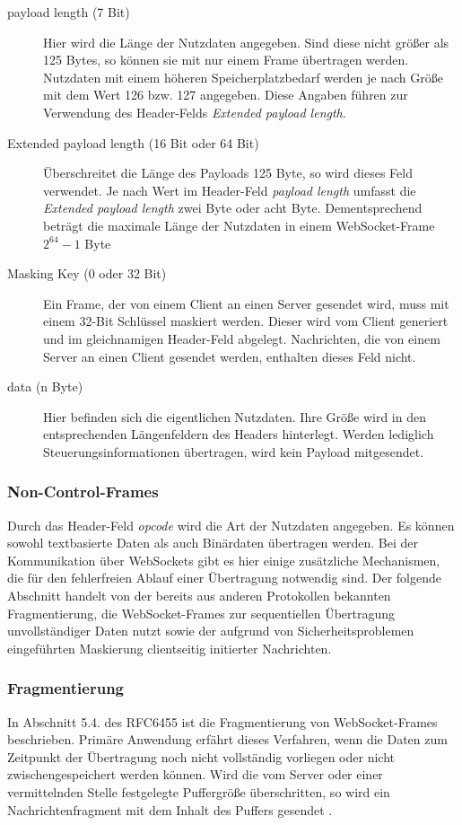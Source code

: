 \documentclass[11pt,a4paper,titlepage]{scrartcl}
\numberwithin{equation}{section}
\begin{document}
\begin{description}
	\item[payload length (7 Bit)] Hier wird die Länge der Nutzdaten angegeben. Sind diese nicht größer als 125 Bytes, so können sie mit nur einem Frame übertragen werden. Nutzdaten mit einem höheren Speicherplatzbedarf werden je nach Größe mit dem Wert 126 bzw. 127 angegeben. Diese Angaben führen zur Verwendung des Header-Felds \textit{Extended payload length}.
	\item[Extended payload length (16 Bit oder 64 Bit)] Überschreitet die Länge des Payloads 125 Byte, so wird dieses Feld verwendet. Je nach Wert im Header-Feld \textit{payload length} umfasst die \textit{Extended payload length} zwei Byte oder acht Byte. Dementsprechend beträgt die maximale Länge der Nutzdaten in einem WebSocket-Frame $2^{64} - 1$ Byte \autocite[41]{gorski_websockets_2015}
	\item[Masking Key (0 oder 32 Bit)] Ein Frame, der von einem Client an einen Server gesendet wird, muss mit einem 32-Bit Schlüssel maskiert werden. Dieser wird vom Client generiert und im gleichnamigen Header-Feld abgelegt. Nachrichten, die von einem Server an einen Client gesendet werden, enthalten dieses Feld nicht.
	\item[data (n Byte)] Hier befinden sich die eigentlichen Nutzdaten. Ihre Größe wird in den entsprechenden Längenfeldern des Headers hinterlegt. Werden lediglich Steuerungsinformationen übertragen, wird kein Payload mitgesendet.
\end{description}

\subsubsection{Non-Control-Frames}\label{subsubsec:wsNCFrames} 
Durch das Header-Feld \textit{opcode} wird die Art der Nutzdaten angegeben. Es können sowohl textbasierte Daten als auch Binärdaten übertragen werden. Bei der Kommunikation über WebSockets gibt es hier einige zusätzliche Mechanismen, die für den fehlerfreien Ablauf einer Übertragung notwendig sind. Der folgende Abschnitt handelt von der bereits aus anderen Protokollen bekannten Fragmentierung, die WebSocket-Frames zur sequentiellen Übertragung unvollständiger Daten nutzt sowie der aufgrund von Sicherheitsproblemen eingeführten Maskierung clientseitig initierter Nachrichten.

\subsubsection*{Fragmentierung}\label{subsubsec:wsFragment}
In Abschnitt 5.4. des RFC6455 ist die Fragmentierung von WebSocket-Frames beschrieben. Primäre Anwendung erfährt dieses Verfahren, wenn die Daten zum Zeitpunkt der Übertragung noch nicht vollständig vorliegen oder nicht zwischengespeichert werden können. Wird die vom Server oder einer vermittelnden Stelle festgelegte Puffergröße überschritten, so wird ein Nachrichtenfragment mit dem Inhalt des Puffers gesendet \autocite[32]{fette_websocket_2011}.\\
\end{document}
